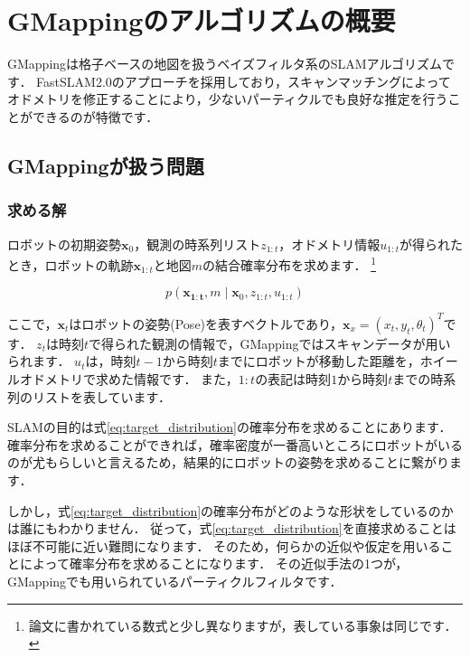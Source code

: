 \documentclass[{../../master}]{subfiles}
\begin{document}
\section{GMappingのアルゴリズムの概要}
\label{sec:gmapping_algorithm}

GMappingは格子ベースの地図を扱うベイズフィルタ系のSLAMアルゴリズムです．
FastSLAM2.0のアプローチを採用しており，スキャンマッチングによってオドメトリを修正することにより，少ないパーティクルでも良好な推定を行うことができるのが特徴です．

\subsection{GMappingが扱う問題}

\subsubsection{求める解}

ロボットの初期姿勢$\bm{x}_{0}$，観測の時系列リスト$z_{1:t}$，オドメトリ情報$u_{1:t}$が得られたとき，ロボットの軌跡$\bm{x}_{1:t}$と地図$m$の結合確率分布を求めます．
\footnote{論文\cite{Gmapping}に書かれている数式と少し異なりますが，表している事象は同じです．}

\begin{equation}
  p(\bm{x_{1:t}}, m \mid \bm{x}_{0}, z_{1:t}, u_{1:t})
  \label{eq:target_distribution}
\end{equation}

ここで，$\bm{x}_{t}$はロボットの姿勢(Pose)を表すベクトルであり，$\bm{x}_{x} = (x_{t}, y_{t}, \theta_{t})^T$です．
$z_{t}$は時刻$t$で得られた観測の情報で，GMappingではスキャンデータが用いられます．
$u_{t}$は，時刻$t-1$から時刻$t$までにロボットが移動した距離を，ホイールオドメトリで求めた情報です．
また，$1:t$の表記は時刻$1$から時刻$t$までの時系列のリストを表しています．

SLAMの目的は式\ref{eq:target_distribution}の確率分布を求めることにあります．
確率分布を求めることができれば，確率密度が一番高いところにロボットがいるのが尤もらしいと言えるため，結果的にロボットの姿勢を求めることに繋がります．

しかし，式\ref{eq:target_distribution}の確率分布がどのような形状をしているのかは誰にもわかりません．
従って，式\ref{eq:target_distribution}を直接求めることはほぼ不可能に近い難問になります．
そのため，何らかの近似や仮定を用いることによって確率分布を求めることになります．
その近似手法の1つが，GMappingでも用いられているパーティクルフィルタです．
\end{document}
